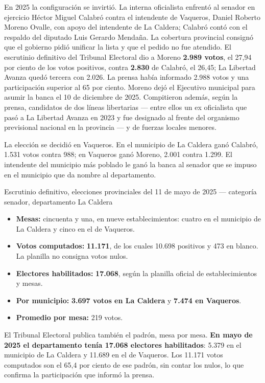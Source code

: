 En 2025 la configuración se invirtió. La interna oficialista enfrentó al senador en ejercicio Héctor Miguel Calabró contra el intendente de Vaqueros, Daniel Roberto Moreno Ovalle, con apoyo del intendente de La Caldera; Calabró contó con el respaldo del diputado Luis Gerardo Mendaña. La cobertura provincial consignó que el gobierno pidió unificar la lista y que el pedido no fue atendido. El escrutinio definitivo del Tribunal Electoral dio a Moreno \textbf{2.989 votos}, el 27,94 por ciento de los votos positivos, contra \textbf{2.830} de Calabró, el 26,45; La Libertad Avanza quedó tercera con 2.026. La prensa había informado 2.988 votos y una participación superior al 65 por ciento. Moreno dejó el Ejecutivo municipal para asumir la banca el 10 de diciembre de 2025. Compitieron además, según la prensa, candidatos de dos líneas libertarias --- entre ellos un ex oficialista que pasó a La Libertad Avanza en 2023 y fue designado al frente del organismo previsional nacional en la provincia --- y de fuerzas locales menores.

La elección se decidió en Vaqueros. En el municipio de La Caldera ganó Calabró, 1.531 votos contra 988; en Vaqueros ganó Moreno, 2.001 contra 1.299. El intendente del municipio más poblado le ganó la banca al senador que se impuso en el municipio que da nombre al departamento.

\begin{ficha}{Escrutinio definitivo, elecciones provinciales del 11 de mayo de 2025 --- categoría senador, departamento La Caldera}
\begin{itemize}[leftmargin=*,nosep]
\item \textbf{Mesas:} cincuenta y una, en nueve establecimientos: cuatro en el municipio de La Caldera y cinco en el de Vaqueros.
\item \textbf{Votos computados:} \textbf{11.171}, de los cuales 10.698 positivos y 473 en blanco. La planilla no consigna votos nulos.
\item \textbf{Electores habilitados:} \textbf{17.068}, según la planilla oficial de establecimientos y mesas.
\item \textbf{Por municipio:} \textbf{3.697 votos en La Caldera} y \textbf{7.474 en Vaqueros}.
\item \textbf{Promedio por mesa:} 219 votos.
\end{itemize}
\end{ficha}

El Tribunal Electoral publica también el padrón, mesa por mesa. \textbf{En mayo de 2025 el departamento tenía 17.068 electores habilitados}: 5.379 en el municipio de La Caldera y 11.689 en el de Vaqueros. Los 11.171 votos computados son el 65,4 por ciento de ese padrón, sin contar los nulos, lo que confirma la participación que informó la prensa.

